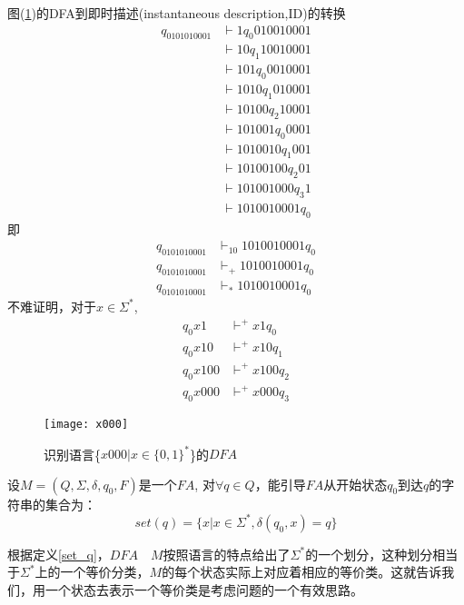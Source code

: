 \begin{example}
	图(\ref{fig:x000ID})的DFA到即时描述(instantaneous description,ID)的转换
	\begin{align*}
		q_0101010001 &\vdash 1 q_0 010010001 \\
		&\vdash 10 q_1 10010001 \\
		&\vdash 101 q_0 0010001 \\
		&\vdash 1010 q_1 010001 \\
		&\vdash 10100 q_2 10001 \\
		&\vdash 101001 q_0 0001 \\
		&\vdash 1010010 q_1 001 \\
		&\vdash 10100100 q_2 01 \\
		&\vdash 101001000 q_3 1 \\
		&\vdash 1010010001 q_0
	\end{align*}
	即
	\begin{align*}
		q_0101010001 &\vdash_{10}1010010001 q_0 \\
		q_0101010001 &\vdash_{+}1010010001 q_0 \\
		q_0101010001 &\vdash_{\ast}1010010001 q_0 
	\end{align*}
	不难证明，对于$x\in\Sigma^{\ast}$,
	\begin{align*}
	q_0x1 &\vdash^{+}x1q_0     \\
	q_0x10 &\vdash^{+}x10q_1   \\
	q_0x100 &\vdash^{+}x100q_2 \\
	q_0x000 &\vdash^{+}x000q_3 
	\end{align*}
	
	\begin{figure}[htbp]
		\texttt{[image: x000]}
		\caption{识别语言\{$x000|x\in\{0,1\}^{\ast}$\}的$DFA$}
		\label{fig:x000ID}       %
	\end{figure}
\end{example}

\begin{definition}\label{set_q}
	设$M=(Q,\Sigma,\delta,q_0,F)$是一个$FA$, 对$\forall q\in Q$，能引导$FA$从开始状态$q_0$到达$q$的字符串的集合为：
\[set(q)=\{x|x\in\Sigma^{\ast},\delta(q_0,x)=q\}\]
\end{definition}

\begin{note}
	根据定义\ref{set_q}，$DFA\quad M$按照语言的特点给出了$\Sigma^\ast$的一个划分，这种划分相当于$\Sigma^\ast$上的一个等价分类，$M$的每个状态实际上对应着相应的等价类。这就告诉我们，用一个状态去表示一个等价类是考虑问题的一个有效思路。	
\end{note}

